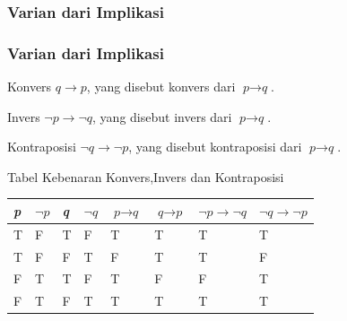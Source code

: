 \documentclass[handout]{beamer}
\theoremstyle{definition}
\theoremstyle{example}
\begin{document}
\subsubsection{Varian dari Implikasi}
\begin{frame}
	\frametitle{Varian dari Implikasi}
  \small	
	\begin{block}{Konvers}
	$q \rightarrow p$, yang disebut konvers dari $\textit{p} \rightarrow \textit{q}$.
     \end{block}	
	\begin{block}{Invers}
	$\neg\textit{p}\rightarrow\neg\textit{q}$, yang disebut invers dari $\textit{p} \rightarrow \textit{q}$.\\
    \end{block}	
	\begin{block}{Kontraposisi}
	$\neg\textit{q} \rightarrow\neg\textit{p}$, yang disebut kontraposisi dari $\textit{p} \rightarrow \textit{q}$.\\
    \end{block}
	\begin{block}{Tabel Kebenaran Konvers,Invers dan Kontraposisi}	
		\begin{tabular}{ | l | l | l | l | l | l | l |l |}
			\hline
			\textit{p} & $\neg\textit{p}$ & \textit{q} & $\neg\textit{q}$ & $\textit{p}\rightarrow\textit{q}$ & $\textit{q}\rightarrow\textit{p}$ & $\neg\textit{p}\rightarrow\neg\textit{q}$ & $\neg\textit{q}\rightarrow\neg\textit{p}$\\ \hline
			T & F & T & F & T & T & T & T \\ \hline
			T & F & F & T & F & T & T & F \\ \hline
			F & T & T & F & T & F & F & T \\ \hline
			F & T & F & T & T & T & T & T \\     		 
			\hline
		\end{tabular}
   \end{block}	
	
\end{frame}
\end{document}
